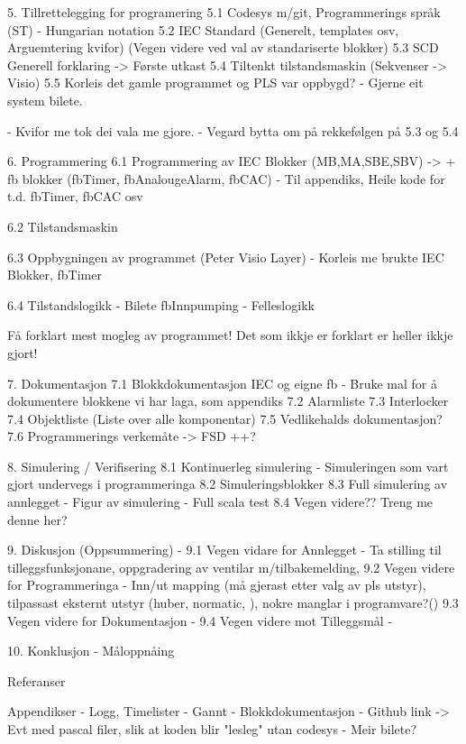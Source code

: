 5. Tillrettelegging for programering
    5.1 Codesys m/git, Programmerings språk (ST) - Hungarian notation
    5.2 IEC Standard (Generelt, templates osv, Arguemtering kvifor) (Vegen videre ved val av standariserte blokker)
    5.3 SCD Generell forklaring -> Første utkast
    5.4 Tiltenkt tilstandsmaskin (Sekvenser -> Visio)
    5.5 Korleis det gamle programmet og PLS var oppbygd?
    - Gjerne eit system bilete.
  
    - Kvifor me tok dei vala me gjore.
    - Vegard bytta om på rekkefølgen på 5.3 og 5.4


6. Programmering
    6.1 Programmering av IEC Blokker (MB,MA,SBE,SBV) -> + fb blokker (fbTimer, fbAnalougeAlarm, fbCAC)
    - Til appendiks, Heile kode for t.d. fbTimer, fbCAC osv
   
    6.2 Tilstandsmaskin

    6.3 Oppbygningen av programmet (Peter Visio Layer)
    - Korleis me brukte IEC Blokker, fbTimer

    6.4 Tilstandslogikk
    - Bilete fbInnpumping
    - Felleslogikk


    Få forklart mest mogleg av programmet!
    Det som ikkje er forklart er heller ikkje gjort!

7. Dokumentasjon
    7.1 Blokkdokumentasjon IEC og eigne fb
    - Bruke mal for å dokumentere blokkene vi har laga, som appendiks
    7.2 Alarmliste
    7.3 Interlocker
    7.4 Objektliste (Liste over alle komponentar)
    7.5 Vedlikehalds dokumentasjon? 
    7.6 Programmerings verkemåte -> FSD
    ++?


8. Simulering / Verifisering
    8.1 Kontinuerleg simulering
    - Simuleringen som vart gjort undervegs i programmeringa
    8.2 Simuleringsblokker
    8.3 Full simulering av annlegget
    - Figur av simulering
    - Full scala test
    8.4 Vegen videre?? Treng me denne her?

9. Diskusjon (Oppsummering)             - 
    9.1 Vegen vidare for Annlegget      - Ta stilling til tilleggsfunksjonane, oppgradering av ventilar m/tilbakemelding, 
    9.2 Vegen videre for Programmeringa - Inn/ut mapping (må gjerast etter valg av pls utstyr), tilpassast eksternt utstyr (huber, normatic, ), 
                                          nokre manglar i programvare?()
    9.3 Vegen videre for Dokumentasjon  - 
    9.4 Vegen videre mot Tilleggsmål    - 

10. Konklusjon 
    - Måloppnåing


Referanser

Appendikser
- Logg, Timelister
- Gannt
- Blokkdokumentasjon
- Github link -> Evt med pascal filer, slik at koden blir "lesleg" utan codesys
- Meir bilete?

